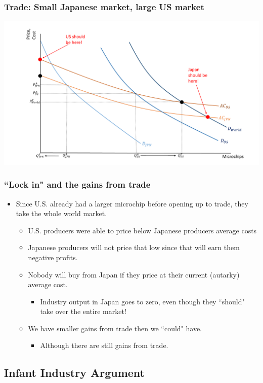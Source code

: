 \documentclass{beamer}
\begin{document}
\begin{frame}
	\frametitle{Trade: Small Japanese market, large US market}
	\includegraphics[scale=0.32]{SL4_23.pdf}
\end{frame}

\begin{frame}
	\frametitle{``Lock in" and the gains from trade}
	\begin{itemize}
		\item Since U.S. already had a larger microchip before opening up to trade, they take the whole world market.
			\begin{itemize}
				\item U.S. producers were able to price below Japanese producers average costs
				\item Japanese producers will not price that low since that will earn them negative profits.
				\item Nobody will buy from Japan if they price at their current (autarky) average cost.
					\begin{itemize}
						\item Industry output in Japan goes to zero, even though they ``should" take over the entire market!
					\end{itemize}
				\item We have smaller gains from trade then we ``could" have.
					\begin{itemize}
						\item Although there are still gains from trade. 
					\end{itemize}
			\end{itemize}
	\end{itemize}

\end{frame}

\subsection{Infant Industry Argument}
\end{document}
